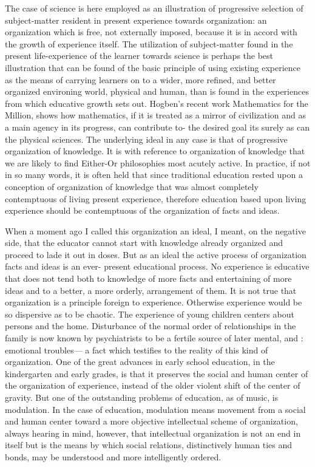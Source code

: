 The case of science is here employed as an illustration of progressive selection of 
subject-matter resident in present experience towards organization: an organization which 
is free, not externally imposed, because it is in accord with the growth of experience itself. The utilization of subject-matter found in the present life-experience of the learner 
towards science is perhaps the best illustration that can be found of the basic principle of 
using existing experience as the means of carrying learners on to a wider, more refined, 
and better organized environing world, physical and human, than is found in the 
experiences from which educative growth sets out. Hogben's recent work Mathematics 
for the Million, shows how mathematics, if it is treated as a mirror of civilization and as 
a main agency in its progress, can contribute to- the desired goal its surely as can the 
physical sciences. The underlying ideal in any case is that of progressive organization of 
knowledge. It is with reference to organization of knowledge that we are likely to find 
Either-Or philosophies most acutely active. In practice, if not in so many words, it is 
often held that since traditional education rested upon a conception of organization of 
knowledge that was almost completely contemptuous of living present experience, 
therefore education based upon living experience should be contemptuous of the 
organization of facts and ideas. 

When a moment ago I called this organization an ideal, I meant, on the negative side, 
that the educator cannot start with knowledge already organized and proceed to lade it out 
in doses. But as an ideal the active process of organization facts and ideas is an ever- 
present educational process. No experience is educative that does not tend both to 
knowledge of more facts and entertaining of more ideas and to a better, a more orderly, 
arrangement of them. It is not true that organization is a principle foreign to experience. 
Otherwise experience would be so dispersive as to be chaotic. The experience of young 
children centers about persons and the home. Disturbance of the normal order of 
relationships in the family is now known by psychiatrists to be a fertile source of later 
mental, and : emotional troubles— a fact which testifies to the reality of this kind of 
organization. One of the great advances in early school education, in the kindergarten and 
early grades, is that it preserves the social and human center of the organization of 
experience, instead of the older violent shift of the center of gravity. But one of the 
outstanding problems of education, as of music, is modulation. In the case of education, 
modulation means movement from a social and human center toward a more objective 
intellectual scheme of organization, always hearing in mind, however, that intellectual 
organization is not an end in itself but is the means by which social relations, distinctively 
human ties and bonds, may be understood and more intelligently ordered. 

